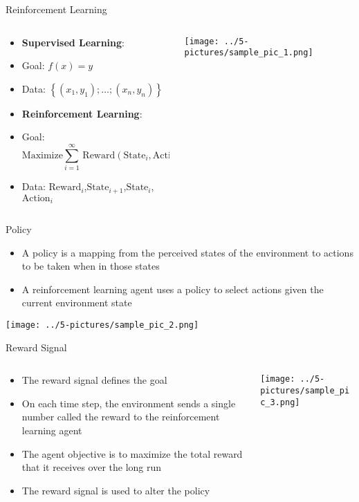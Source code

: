 \documentclass[11pt]{beamer}
\begin{document}
\begin{frame}{Reinforcement Learning}
\begin{columns}[T] %
\begin{column}{.48\textwidth}
        \begin{itemize}
		\item \textbf{Supervised Learning}:
		\item Goal: $f(x)=y$
		\item Data: $\left\{ (x_1,y_1);\dots;(x_n,y_n)\right\}$
		\item \textbf{Reinforcement Learning}:
		\item Goal:$$\text{Maximize} \sum\limits_{i=1}^\infty \, \text{Reward}(\text{State}_i, \text{Action}_i)$$
		\item Data: $\text{Reward}_i$,$\text{State}_{i+1}$,$\text{State}_i$, $\text{Action}_i$
        \end{itemize}
\end{column}%
\hfill%
\begin{column}{.48\textwidth}
        \texttt{[image: ../5-pictures/sample\_pic\_1.png]}
\end{column}%
\end{columns}
\end{frame}
\begin{frame}{Policy}
	\begin{itemize}
		\item A policy is a mapping from the perceived states of the environment to actions to be taken when in those states
		\item A reinforcement learning agent uses a policy to select actions given the current environment state
	\end{itemize}
	\begin{center}
	\texttt{[image: ../5-pictures/sample\_pic\_2.png]}
	\end{center}
\end{frame}
\begin{frame}{Reward Signal}
\begin{columns}[T] %
\begin{column}{.48\textwidth}
        \begin{itemize}
		\item The reward signal defines the goal
		\item On each time step, the environment sends a single number called the reward to the reinforcement learning agent
		\item The agent objective is to maximize the total reward that it receives over the long run
		\item The reward signal is used to alter the policy
        \end{itemize}
\end{column}%
\hfill%
\begin{column}{.48\textwidth}
        \texttt{[image: ../5-pictures/sample\_pic\_3.png]}
\end{column}%
\end{columns}
\end{frame}
\end{document}
